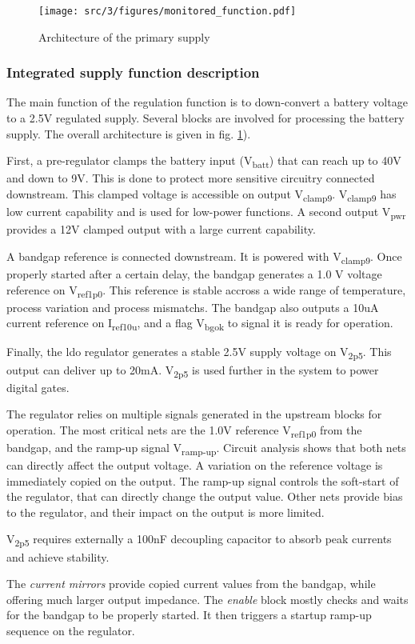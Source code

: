 \begin{figure}[!htbp]
  \centering
  \texttt{[image: src/3/figures/monitored\_function.pdf]}
  \caption{Architecture of the primary supply}
  \label{fig:monitored_function}
\end{figure}


\subsubsection{Integrated supply function description}
\label{sec:supply-desc}

The main function of the regulation function is to down-convert a battery voltage to a 2.5V regulated supply.
Several blocks are involved for processing the battery supply.
The overall architecture is given in fig. \ref{fig:monitored_function}).

First, a pre-regulator clamps the battery input (V\textsubscript{batt}) that can reach up to 40V and down to 9V.
This is done to protect more sensitive circuitry connected downstream.
This clamped voltage is accessible on output V\textsubscript{clamp9}.
V\textsubscript{clamp9} has low current capability and is used for low-power functions.
A second output V\textsubscript{pwr} provides a 12V clamped output with a large current capability.

A bandgap reference is connected downstream.
It is powered with V\textsubscript{clamp9}.
Once properly started after a certain delay, the bandgap generates a 1.0 V voltage reference on V\textsubscript{ref1p0}.
This reference is stable accross a wide range of temperature, process variation and process mismatchs.
The bandgap also outputs a 10uA current reference on I\textsubscript{ref10u}, and a flag V\textsubscript{bgok} to signal it is ready for operation.

Finally, the \gls{ldo} regulator generates a stable 2.5V supply voltage on V\textsubscript{2p5}.
This output can deliver up to 20mA.
V\textsubscript{2p5} is used further in the system to power digital gates.

The regulator relies on multiple signals generated in the upstream blocks for operation.
The most critical nets are the 1.0V reference V\textsubscript{ref1p0} from the bandgap, and the ramp-up signal V\textsubscript{ramp-up}.
Circuit analysis shows that both nets can directly affect the output voltage.
A variation on the reference voltage is immediately copied on the output.
The ramp-up signal controls the soft-start of the regulator, that can directly change the output value.
Other nets provide bias to the regulator, and their impact on the output is more limited.

V\textsubscript{2p5} requires externally a 100nF decoupling capacitor to absorb peak currents and achieve stability.

The \textit{current mirrors} provide copied current values from the bandgap, while offering much larger output impedance.
The \textit{enable} block mostly checks and waits for the bandgap to be properly started.
It then triggers a startup ramp-up sequence on the regulator.
